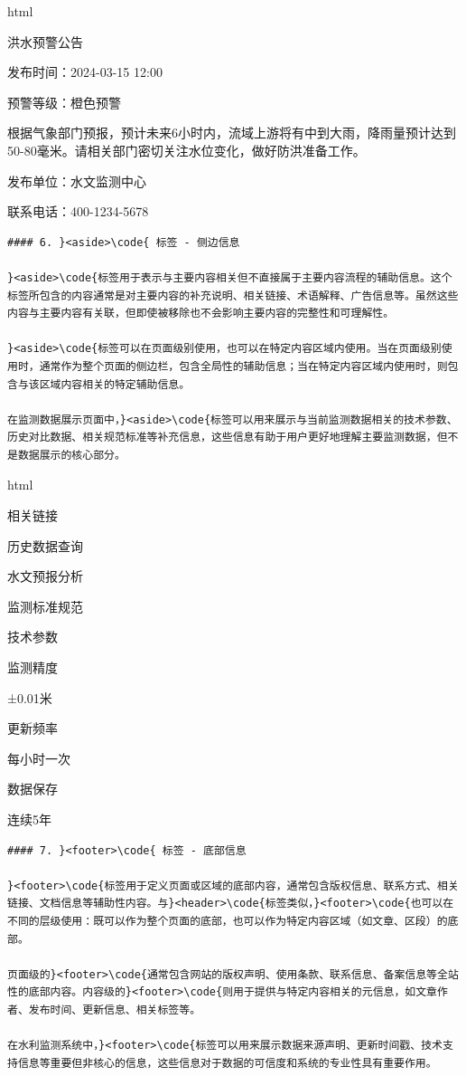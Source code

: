 html

洪水预警公告

发布时间：2024-03-15 12:00

预警等级：橙色预警

根据气象部门预报，预计未来6小时内，流域上游将有中到大雨，降雨量预计达到50-80毫米。请相关部门密切关注水位变化，做好防洪准备工作。

发布单位：水文监测中心

联系电话：400-1234-5678

\begin{lstlisting}
#### 6. }<aside>\code{ 标签 - 侧边信息

}<aside>\code{标签用于表示与主要内容相关但不直接属于主要内容流程的辅助信息。这个标签所包含的内容通常是对主要内容的补充说明、相关链接、术语解释、广告信息等。虽然这些内容与主要内容有关联，但即使被移除也不会影响主要内容的完整性和可理解性。

}<aside>\code{标签可以在页面级别使用，也可以在特定内容区域内使用。当在页面级别使用时，通常作为整个页面的侧边栏，包含全局性的辅助信息；当在特定内容区域内使用时，则包含与该区域内容相关的特定辅助信息。

在监测数据展示页面中，}<aside>\code{标签可以用来展示与当前监测数据相关的技术参数、历史对比数据、相关规范标准等补充信息，这些信息有助于用户更好地理解主要监测数据，但不是数据展示的核心部分。

\end{lstlisting}

html

相关链接

历史数据查询

水文预报分析

监测标准规范

技术参数

监测精度

±0.01米

更新频率

每小时一次

数据保存

连续5年

\begin{lstlisting}
#### 7. }<footer>\code{ 标签 - 底部信息

}<footer>\code{标签用于定义页面或区域的底部内容，通常包含版权信息、联系方式、相关链接、文档信息等辅助性内容。与}<header>\code{标签类似，}<footer>\code{也可以在不同的层级使用：既可以作为整个页面的底部，也可以作为特定内容区域（如文章、区段）的底部。

页面级的}<footer>\code{通常包含网站的版权声明、使用条款、联系信息、备案信息等全站性的底部内容。内容级的}<footer>\code{则用于提供与特定内容相关的元信息，如文章作者、发布时间、更新信息、相关标签等。

在水利监测系统中，}<footer>\code{标签可以用来展示数据来源声明、更新时间戳、技术支持信息等重要但非核心的信息，这些信息对于数据的可信度和系统的专业性具有重要作用。

\end{lstlisting}

